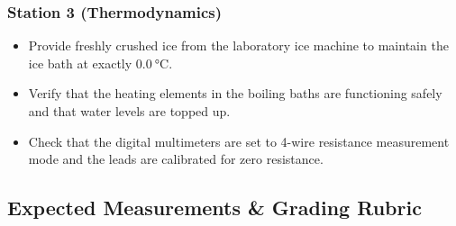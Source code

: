 \subsubsection{Station 3 (Thermodynamics)}
\begin{itemize}[leftmargin=*, noitemsep]
    \item Provide freshly crushed ice from the laboratory ice machine to maintain the ice bath at exactly $\SI{0.0}{\celsius}$.
    \item Verify that the heating elements in the boiling baths are functioning safely and that water levels are topped up.
    \item Check that the digital multimeters are set to 4-wire resistance measurement mode and the leads are calibrated for zero resistance.
\end{itemize}

\subsection{Expected Measurements \& Grading Rubric}


